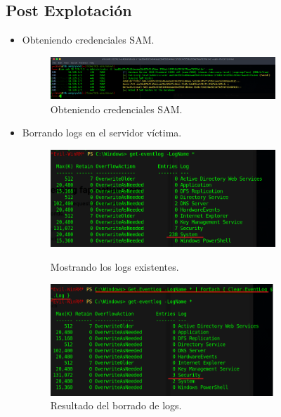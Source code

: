 \documentclass{article}
\begin{document}
\subsection{Post Explotación}
\begin{itemize}
	\item Obteniendo credenciales SAM.
	\begin{figure}[h]
		\center
		\includegraphics[width=0.8\textwidth]{images/fuse/sam.png}
		\caption{Obteniendo credenciales SAM.}

	\end{figure}

	\item Borrando logs en el servidor víctima.
	\begin{figure}[h]
		\center
		\includegraphics[width=0.8\textwidth]{images/fuse/getlogs.png}
		\caption{Mostrando los logs existentes.}

		\includegraphics[width=0.8\textwidth]{images/fuse/clearlog.png}
		\caption{Resultado del borrado de logs.}
	\end{figure}
\end{itemize}
\end{document}
